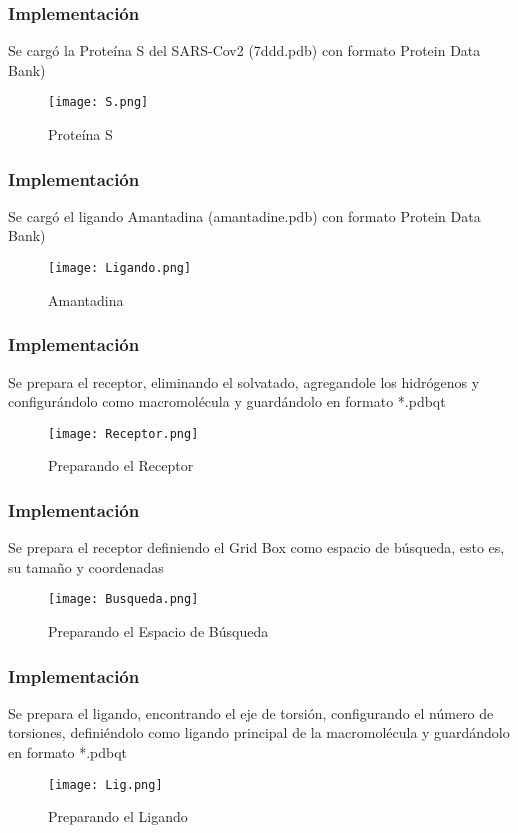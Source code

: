 \documentclass{beamer}
\begin{document}
\begin{frame}\frametitle{Implementación}
Se cargó la Proteína S del SARS-Cov2 (7ddd.pdb) con formato Protein Data Bank)
  \begin{figure}[h]
      \centering
      \texttt{[image: S.png]}
      \caption{Proteína S}
      \label{fig:my_label}
  \end{figure}  
\end{frame} 


\begin{frame}\frametitle{Implementación}
Se cargó el ligando Amantadina (amantadine.pdb) con formato Protein Data Bank)
  \begin{figure}[h]
      \centering
      \texttt{[image: Ligando.png]}
      \caption{Amantadina}
      \label{fig:my_label}
  \end{figure}  
\end{frame} 


\begin{frame}\frametitle{Implementación}
Se prepara el receptor, eliminando el solvatado, agregandole los hidrógenos y configurándolo como macromolécula y guardándolo en formato *.pdbqt
  \begin{figure}[h]
      \centering
      \texttt{[image: Receptor.png]}
      \caption{Preparando el Receptor}
      \label{fig:my_label}
  \end{figure}  
\end{frame} 


\begin{frame}\frametitle{Implementación}
Se prepara el receptor definiendo el Grid Box como espacio de búsqueda, esto es, su tamaño y coordenadas
  \begin{figure}[h]
      \centering
      \texttt{[image: Busqueda.png]}
      \caption{Preparando el Espacio de Búsqueda}
      \label{fig:my_label}
  \end{figure}  
\end{frame} 


\begin{frame}\frametitle{Implementación}
Se prepara el ligando, encontrando el eje de torsión, configurando el número de torsiones, definiéndolo como ligando principal de la macromolécula y guardándolo en formato *.pdbqt
  \begin{figure}[h]
      \centering
      \texttt{[image: Lig.png]}
      \caption{Preparando el Ligando}
      \label{fig:my_label}
  \end{figure}  
\end{frame} 
\end{document}
